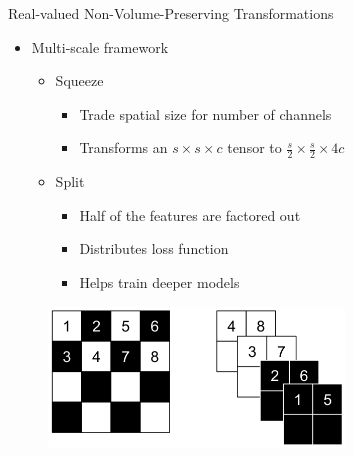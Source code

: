 \begin{frame}{Real-valued Non-Volume-Preserving Transformations}
    \begin{itemize}
        \item Multi-scale framework
        \begin{itemize}
            \item Squeeze
            \begin{itemize}
                \item Trade spatial size for number of channels
                \item Transforms an $s \times s \times c$ tensor to $\frac{s}{2} \times \frac{s}{2} \times 4c$
            \end{itemize}
            \item Split
            \begin{itemize}
                \item Half of the features are factored out
                \item Distributes loss function
                \item Helps train deeper models
            \end{itemize}
        \end{itemize}
    \end{itemize}
    \begin{figure}[htbp]
        \centering
        \includegraphics[width=0.7\textwidth]{Images/realnvp_squeeze.png}
    \end{figure}
\end{frame}

